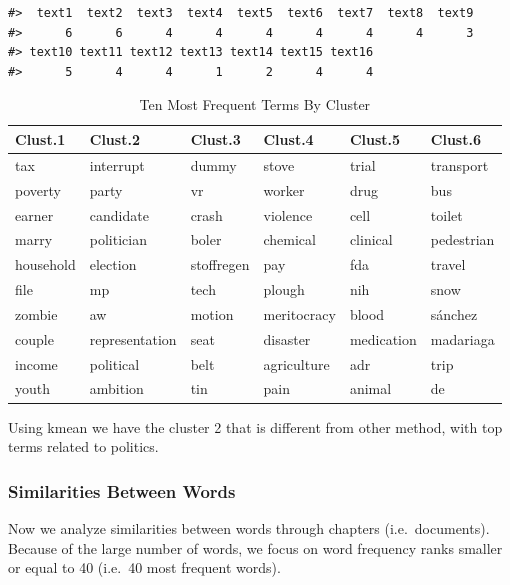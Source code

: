 \documentclass[
]{article}
\begin{document}
\begin{verbatim}
#>  text1  text2  text3  text4  text5  text6  text7  text8  text9 
#>      6      6      4      4      4      4      4      4      3 
#> text10 text11 text12 text13 text14 text15 text16 
#>      5      4      4      1      2      4      4
\end{verbatim}

\begin{table}

\caption{\label{tab:Euclidean-based km}Ten Most Frequent Terms By Cluster}
\centering
\begin{tabular}[t]{l|l|l|l|l|l}
\hline
Clust.1 & Clust.2 & Clust.3 & Clust.4 & Clust.5 & Clust.6\\
\hline
tax & interrupt & dummy & stove & trial & transport\\
\hline
poverty & party & vr & worker & drug & bus\\
\hline
earner & candidate & crash & violence & cell & toilet\\
\hline
marry & politician & boler & chemical & clinical & pedestrian\\
\hline
household & election & stoffregen & pay & fda & travel\\
\hline
file & mp & tech & plough & nih & snow\\
\hline
zombie & aw & motion & meritocracy & blood & sánchez\\
\hline
couple & representation & seat & disaster & medication & madariaga\\
\hline
income & political & belt & agriculture & adr & trip\\
\hline
youth & ambition & tin & pain & animal & de\\
\hline
\end{tabular}
\end{table}

Using kmean we have the cluster 2 that is different from other method,
with top terms related to politics.

\hypertarget{similarities-between-words}{%
\subsubsection{Similarities Between
Words}\label{similarities-between-words}}

Now we analyze similarities between words through chapters
(i.e.~documents). Because of the large number of words, we focus on word
frequency ranks smaller or equal to 40 (i.e.~40 most frequent words).
\end{document}
